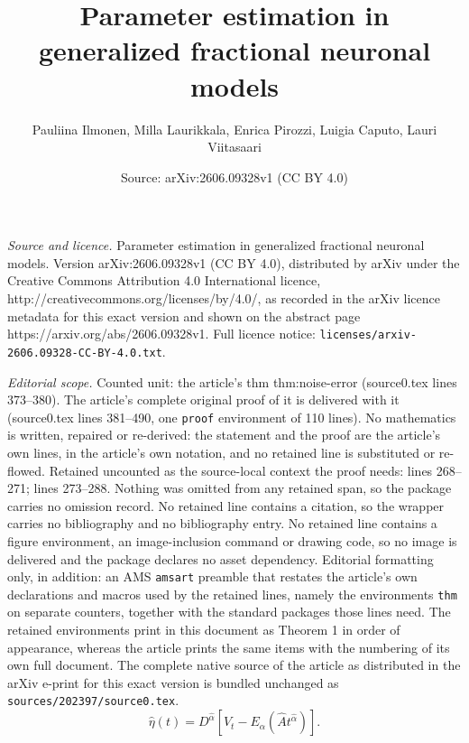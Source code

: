 \documentclass[10pt,a4paper]{amsart}
\title{Parameter estimation in generalized fractional neuronal models}
\author{Pauliina Ilmonen, Milla Laurikkala, Enrica Pirozzi, Luigia Caputo, Lauri Viitasaari}
\date{Source: arXiv:2606.09328v1 (CC BY 4.0)}
\begin{document}
\maketitle

\noindent\emph{Source and licence.} Parameter estimation in generalized fractional neuronal models. Version arXiv:2606.09328v1 (CC BY 4.0), distributed by arXiv under the Creative Commons Attribution 4.0 International licence, http://creativecommons.org/licenses/by/4.0/, as recorded in the arXiv licence metadata for this exact version and shown on the abstract page https://arxiv.org/abs/2606.09328v1. Full licence notice: \texttt{licenses/arxiv-2606.09328-CC-BY-4.0.txt}.\par\smallskip

\noindent\textit{Editorial scope.} Counted unit: the article's thm thm:noise-error (source0.tex lines 373--380). The article's complete original proof of it is delivered with it (source0.tex lines 381--490, one \texttt{proof} environment of 110 lines). No mathematics is written, repaired or re-derived: the statement and the proof are the article's own lines, in the article's own notation, and no retained line is substituted or re-flowed.  Retained uncounted as the source-local context the proof needs: lines 268--271; lines 273--288.  Nothing was omitted from any retained span, so the package carries no omission record.  No retained line contains a citation, so the wrapper carries no bibliography and no bibliography entry.  No retained line contains a figure environment, an image-inclusion command or drawing code, so no image is delivered and the package declares no asset dependency.  Editorial formatting only, in addition: an AMS \texttt{amsart} preamble that restates the article's own declarations and macros used by the retained lines, namely the environments \texttt{thm} on separate counters, together with the standard packages those lines need.  The retained environments print in this document as Theorem 1 in order of appearance, whereas the article prints the same items with the numbering of its own full document.  The complete native source of the article as distributed in the arXiv e-print for this exact version is bundled unchanged as \texttt{sources/202397/source0.tex}.
\begin{equation}
\label{eq:eta-proxy}
    \hat\eta(t) = D^{\hat\alpha}\left[V_t - E_{\hat\alpha}(\hat{A}t^{\hat\alpha})\right].
\end{equation}
\end{document}

